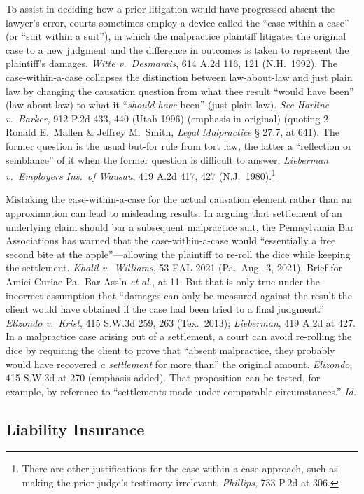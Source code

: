 \documentclass[
  12pt,
  letterpaper,
]{scrartcl}
\begin{document}
To assist in deciding how a prior litigation would have progressed absent
the lawyer's error, courts sometimes employ a device called the ``case within a case'' (or
``suit within a suit''), in which the malpractice plaintiff litigates the
original case to a new judgment and the difference in outcomes is taken to
represent the plaintiff's damages. \textit{Witte v.~Desmarais}, 614 A.2d 116,
121 (N.H.~1992). The case-within-a-case collapses the distinction between
law-about-law and just plain law by changing the causation question from what
thee result ``would have been'' (law-about-law) to what it ``\textit{should
have} been'' (just plain law). \textit{See} \textit{Harline v.~Barker}, 912
P.2d 433, 440 (Utah 1996) (emphasis in original) (quoting 2 Ronald E.~Mallen \&
Jeffrey M.~Smith, \textit{Legal Malpractice} § 27.7, at 641). The former
question is the usual but-for rule from tort law, the latter a ``reflection or
semblance'' of it when the former question is difficult to answer. 
\textit{Lieberman v.~Employers Ins.~of Wausau}, 419 A.2d 417, 427
(N.J.~1980).\footnote{There are other justifications for the case-within-a-case
approach, such as making the prior judge's testimony irrelevant.
\textit{Phillips}, 733 P.2d at 306.}

Mistaking the case-within-a-case for the actual causation element rather than an
approximation can lead to misleading results. In arguing that settlement of an underlying
claim should bar a subsequent malpractice suit, the Pennsylvania Bar
Associations has warned that the case-within-a-case would ``essentially a free
second bite at the apple''---allowing the plaintiff to re-roll the dice while
keeping the settlement. \textit{Khalil v.~Williams}, 53 EAL 2021 (Pa.~Aug.~3,
2021), Brief for Amici Curiae Pa.~Bar Ass'n \textit{et al.}, at 11. But that is
only true under the incorrect assumption that ``damages can only be measured
against the result the client would have obtained if the case had been tried to
a final judgment.'' \textit{Elizondo v.~Krist}, 415 S.W.3d 259, 263
(Tex.~2013); \textit{Lieberman}, 419 A.2d at 427. In a malpractice case arising
out of a settlement, a court can avoid re-rolling the dice by requiring the
client to prove that ``absent malpractice, they probably would have recovered
\emph{a settlement} for more than'' the original amount. \textit{Elizondo}, 415
S.W.3d at 270 (emphasis added). That proposition can be tested, for example, by
reference to ``settlements made under comparable circumstances.'' \textit{Id.}


\subsection{Liability Insurance}
\end{document}
